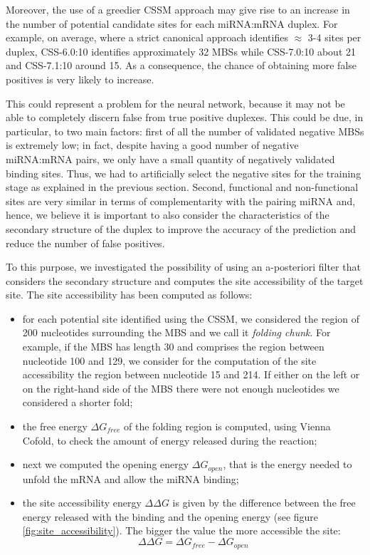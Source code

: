Moreover, the use of a greedier CSSM approach may give rise to an increase in the number of potential candidate sites for each miRNA:mRNA duplex. For example, on average, where a strict canonical approach identifies $\approx$ 3-4 sites per duplex, CSS-6.0:10 identifies approximately 32 MBSs while CSS-7.0:10 about 21 and CSS-7.1:10 around 15. As a consequence, the chance of obtaining more false positives is very likely to increase.  

This could represent a problem for the neural network, because it may not be able to completely discern false from true positive duplexes. This could be due, in particular, to two main factors: first of all the number of validated negative MBSs is extremely low; in fact, despite having a good number of negative miRNA:mRNA pairs, we only have a small quantity of negatively validated binding sites. Thus, we had to artificially select the negative sites for the training stage as explained in the previous section. Second, functional and non-functional sites are very similar in terms of complementarity with the pairing miRNA and, hence, we believe it is important to also consider the characteristics of the secondary structure of the duplex to improve the accuracy of the prediction and reduce the number of false positives. 

To this purpose, we investigated the possibility of using an a-posteriori filter that considers the secondary structure and computes the site accessibility of the target site. The site accessibility has been computed as follows:
\begin{itemize}
	\item for each potential site identified using the CSSM, we considered the region of 200 nucleotides surrounding the MBS and we call it \emph{folding chunk}. For example, if the MBS has length 30 and comprises the region between nucleotide 100 and 129, we consider for the computation of the site accessibility the region between nucleotide 15 and 214. If either on the left or on the right-hand side of the MBS there were not enough nucleotides we considered a shorter fold;
	\item the free energy $\Delta G_{free}$ of the folding region is computed, using Vienna Cofold, to check the amount of energy released during the reaction;
	\item next we computed the opening energy $\Delta G_{open}$, that is the energy needed to unfold the mRNA and allow the miRNA binding;
	\item the site accessibility energy $\Delta\Delta G$ is given by the difference between the free energy released with the binding and the opening energy (see figure \ref{fig:site_accessibility}). The bigger the value the more accessible the site:
	\begin{equation} \label{eq:sa}
		\Delta\Delta G = \Delta G_{free} - \Delta G_{open}
	\end{equation}
	 
\end{itemize}    

